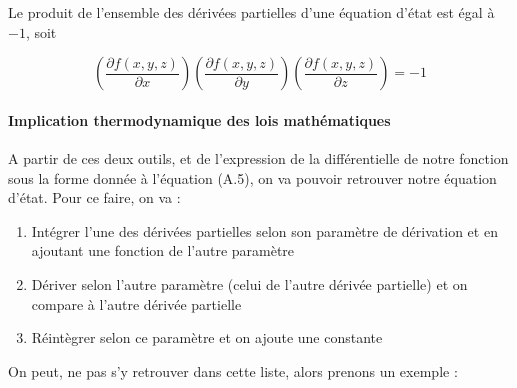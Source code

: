\begin{proposition}
Le produit de l'ensemble des dérivées partielles d'une équation d'état est égal à $-1$, soit

\begin{equation}
\left ( \frac{\partial f(x,y,z)}{\partial x} \right )\left ( \frac{\partial f(x,y,z)}{\partial y} \right )\left ( \frac{\partial f(x,y,z)}{\partial z} \right )=-1
\end{equation}
\end{proposition}

\paragraph{Implication thermodynamique des lois mathématiques} 

A partir de ces deux outils, et de l'expression de la différentielle de notre fonction sous la forme donnée à l'équation (A.5), on va pouvoir retrouver notre équation d'état. Pour ce faire, on va :
\begin{enumerate}
\item Intégrer l'une des dérivées partielles selon son paramètre de dérivation et en ajoutant une fonction de l'autre paramètre
\item Dériver selon l'autre paramètre (celui de l'autre dérivée partielle) et on compare à l'autre dérivée partielle
\item Réintègrer selon ce paramètre et on ajoute une constante
\end{enumerate}

\pagebreak


On peut, ne pas s'y retrouver dans cette liste, alors prenons  un exemple : \\

